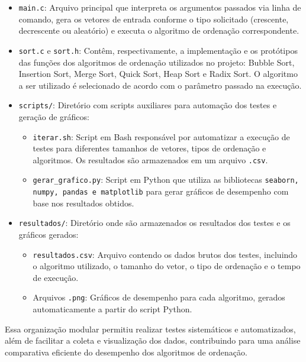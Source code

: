 \begin{itemize}
    \item \texttt{main.c}: Arquivo principal que interpreta os argumentos passados via linha de comando, gera os vetores de entrada conforme o tipo solicitado (crescente, decrescente ou aleatório) e executa o algoritmo de ordenação correspondente.

    \item \texttt{sort.c} e \texttt{sort.h}: Contêm, respectivamente, a implementação e os protótipos das funções dos algoritmos de ordenação utilizados no projeto: Bubble Sort, Insertion Sort, Merge Sort, Quick Sort, Heap Sort e Radix Sort. O algoritmo a ser utilizado é selecionado de acordo com o parâmetro passado na execução.

    \item \texttt{scripts/}: Diretório com scripts auxiliares para automação dos testes e geração de gráficos:
    \begin{itemize}
        \item \texttt{iterar.sh}: Script em Bash responsável por automatizar a execução de testes para diferentes tamanhos de vetores, tipos de ordenação e algoritmos. Os resultados são armazenados em um arquivo \texttt{.csv}.
        \item \texttt{gerar\_grafico.py}: Script em Python que utiliza as bibliotecas \texttt{seaborn, numpy, pandas e
            matplotlib} para gerar gráficos de desempenho com base nos resultados obtidos.
    \end{itemize}

    \item \texttt{resultados/}: Diretório onde são armazenados os resultados dos testes e os gráficos gerados:
    \begin{itemize}
        \item \texttt{resultados.csv}: Arquivo contendo os dados brutos dos testes, incluindo o algoritmo utilizado, o tamanho do vetor, o tipo de ordenação e o tempo de execução.
        \item Arquivos \texttt{.png}: Gráficos de desempenho para cada algoritmo, gerados automaticamente a partir do script Python.
    \end{itemize}
\end{itemize}

Essa organização modular permitiu realizar testes sistemáticos e automatizados, além de facilitar a coleta e visualização dos dados, contribuindo para uma análise comparativa eficiente do desempenho dos algoritmos de ordenação.

